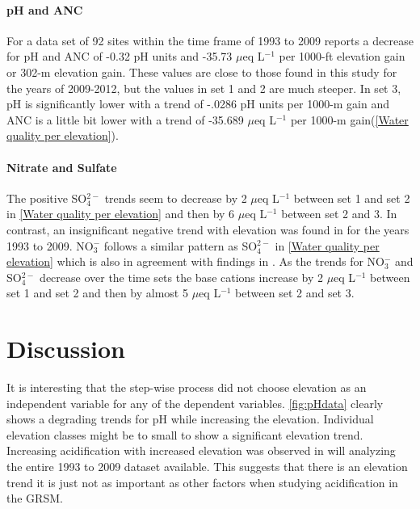 \paragraph{pH and ANC}
For a data set of 92 sites within the time frame of 1993 to 2009 \citet{cai2012} reports a decrease for pH and ANC of -0.32 pH units and -35.73 $\mu$eq L$^{-1}$ per 1000-ft elevation gain or 302-m elevation gain.  These values are close to those found in this study for the years of 2009-2012, but the values in set 1 and 2 are much steeper.  In set 3, pH is significantly lower with a trend of -.0286 pH units per 1000-m gain and ANC is a little bit lower with a trend of -35.689 $\mu$eq L$^{-1}$ per 1000-m gain(\autoref{Water quality per elevation}).  

\paragraph{Nitrate and Sulfate}
The positive SO$_4^{2-}$ trends seem to decrease by 2 $\mu$eq L$^{-1}$ between set 1 and set 2 in \autoref{Water quality per elevation} and then by 6  $\mu$eq L$^{-1}$ between set 2 and 3.  In contrast, an insignificant negative trend with elevation was found in \citet{cai2012} for the years 1993 to 2009.  NO$_3^-$ follows a similar pattern as SO$_4^{2-}$ in \autoref{Water quality per elevation} which is also in agreement with findings in \citet{weathers2006}.  As the trends for  NO$_3^-$ and SO$_4^{2-}$ decrease over the time sets the base cations increase by 2 $\mu$eq L$^{-1}$ between set 1 and set 2 and then by almost 5 $\mu$eq L$^{-1}$ between set 2 and set 3.

\section{Discussion}

It is interesting that the step-wise process did not choose elevation as an independent variable for any of the dependent variables. \autoref{fig:pHdata} clearly shows a degrading trends for pH while increasing the elevation. Individual elevation classes might be to small to show a significant elevation trend.  Increasing acidification with increased elevation was observed in \citet{cai2012} will analyzing the entire 1993 to 2009 dataset available.  This suggests that there is an elevation trend it is just not as important as other factors when studying acidification in the GRSM.

